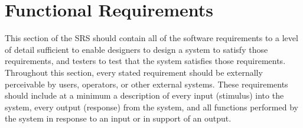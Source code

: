 \documentclass[12pt, titlepage]{article}
\begin{document}
\section{Functional Requirements}
\label{sec:functional_requirements}
This section of the SRS should contain all of the software requirements to a level of detail sufficient to enable designers to design a system to satisfy those requirements, and testers to test that the system satisfies those requirements. Throughout this section, every stated requirement should be externally perceivable by users, operators, or other external systems. These requirements should include at a minimum a description of every input (stimulus) into the system, every output (response) from the system, and all functions performed by the system in response to an input or in support of an output.
\end{document}
